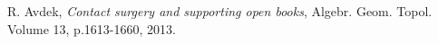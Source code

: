 \documentclass[11pt]{amsart}
\begin{document}
\begin{thebibliography}{}
\begin{comment}

\bibitem[Abb11]{Abbas:JBook}
C. Abbas, \textit{Holomorphic open book decompositions}, Duke Math. J., Vol. 158, p.29-82, 2011.

\bibitem[AbbCH05]{ACH:PlanarWeinstein}
C. Abbas, K. Cieliebak, H. Hofer, \textit{The Weinstein conjecture for planar contact structures in dimension three}, Comment. Math. Helv. 80, p.771–793, 2005.

\bibitem[AS06]{AS:Cotangent}
A. Abbondandolo and M. Schwarz, \textit{On the Floer homology of cotangent bundles}, Comm.
Pure Appl. Math., 59, p.254–316, 2006.

\bibitem[Abo15]{Abouzaid:Viterbo}
M. Abouzaid, \textit{Symplectic cohomology and Viterbo’s theorem}, In ``Free loop
spaces in geometry and topology'', volume 24 of IRMA Lect. Math. Theor. Phys., Eur. Math. Soc., Z\"{u}rich, p.271–485, 2015

\bibitem[Al79]{Ahlfors}
L. Ahlfors, \textit{Complex Analysis: An Introduction to the Theory of Analytic Functions of One Complex Variable}, New York: McGraw-Hill, 1979.


\bibitem[AS08]{AS:Pencil}
D. Auroux and I. Smith, \textit{Lefschetz pencils, branched covers and symplectic invariants}, in \textit{Symplectic 4-manifolds and algebraic surfaces}, Lecture Notes in Math vol. 1938, Springer, Berlin, p.1–53, 2008.
\end{comment}

R. Avdek, \textit{Contact surgery and supporting open books}, Algebr. Geom. Topol. Volume 13, p.1613-1660, 2013.

\begin{comment}
\bibitem[Av20]{Avdek:Dynamics}
R. Avdek, \textit{Combinatorial Reeb dynamics on punctured contact $3$-manifolds}, to appear in Geom. Topol., arXiv:2005.11428, 2020.

\bibitem[Av21a]{Avdek:Liouville}
R. Avdek, \textit{Liouville hypersurfaces and connect sum cobordisms}, J. Symplectic Geom., Vol. 19, 2021.

\bibitem[Av21b]{Avdek:LSFT}
R. Avdek, \textit{Simplified SFT moduli spaces for Legendrian links}, arXiv:2104.00505, 2021.

\bibitem[Av22a]{Avdek:PDH}
R. Avdek, \textit{A filtered generalization of the Chekanov-Eliashberg algebra}, arXiv:2205.13031, 2022.

\bibitem[Av22b]{Avdek:Software}
R. Avdek, \textit{Legendrian links}, software available at \url{https://github.com/RAvdek/legendrian_links}, 2022.


\end{comment}
\end{thebibliography}
\end{document}
